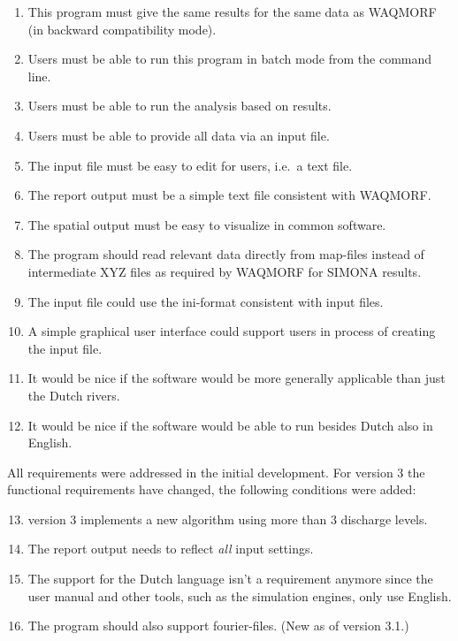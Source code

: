 \begin{enumerate}
\item This program must give the same results for the same data as WAQMORF (in backward compatibility mode).
\item Users must be able to run this program in batch mode from the command line.
\item Users must be able to run the analysis based on \dflowfm results.
\item Users must be able to provide all data via an input file.
\item The input file must be easy to edit for users, i.e.~a text file.
\item The report output must be a simple text file consistent with WAQMORF.
\item The spatial output must be easy to visualize in common software.

\item The program should read relevant data directly from \dflowfm map-files instead of intermediate XYZ files as required by WAQMORF for SIMONA results.

\item The input file could use the ini-format consistent with \dflowfm input files.
\item A simple graphical user interface could support users in process of creating the input file.

\item It would be nice if the software would be more generally applicable than just the Dutch rivers.
\item It would be nice if the software would be able to run besides Dutch also in English.
\end{enumerate}

All requirements were addressed in the initial development.
For \dfastmi version 3 the functional requirements have changed, the following conditions were added:

\begin{enumerate}
\setcounter{enumi}{12} %
\item \dfastmi version 3 implements a new algorithm using more than 3 discharge levels.
\item The report output needs to reflect \emph{all} input settings.
\item The support for the Dutch language isn't a requirement anymore since the user manual and other tools, such as the simulation engines, only use English.
\item The program should also support \dflowfm fourier-files. (New as of version 3.1.)
\end{enumerate}


